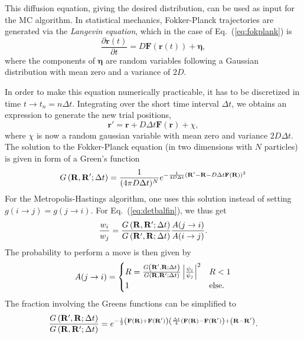 This diffusion equation, giving the desired distribution, can be used as input for the MC algorithm. In statistical mechanics, Fokker-Planck trajectories are generated via the \textit{Langevin equation}, which in the case of Eq.~(\ref{eq:fokplank}) is
\begin{equation}
\frac{\partial \mathbf{r}(t)}{\partial t} = D \mathbf{F}\left(\mathbf{r}(t)\right) + \mathbf{\eta},
\label{eq:langevin}
\end{equation}
where the components of $\mathbf{\eta}$ are random variables following a Gaussian distribution with mean zero and a variance of $2D$.

In order to make this equation numerically practicable, it has to be discretized in time $t \rightarrow t_n = n \Delta t$.
Integrating over the short time interval $\Delta t$, we obtains an expression to generate the new trial positions,
\begin{equation}
\mathbf{r}' = \mathbf{r} + D \Delta t\mathbf{F}\left(\mathbf{r}\right) + \chi,
\label{eq:trialpos}
\end{equation}
where $\chi$ is now a random gaussian variable with mean zero and variance $2D\Delta t$.\\
The solution to the Fokker-Planck equation (in two dimensions with $N$ particles) is given in form of a Green's function \cite{hammond1994monte}
\[
G\left(\mathbf{R},\mathbf{R}';\Delta t\right) = \frac{1}{(4\pi D \Delta t)^N} e^{-\frac{1}{4 D \Delta t} (\mathbf{R} '-\mathbf{R} - D\Delta t \mathbf{F}(\mathbf{R}))^ 2}
\]
For the Metropolis-Hastings algorithm, one uses this solution instead of setting $g(i\rightarrow j) = g(j\rightarrow i)$.
For Eq.~(\ref{eq:detbalfin}), we thus get
\begin{equation*}
\frac{w_i}{w_j} = \frac{G\left(\mathbf{R},\mathbf{R}';\Delta t\right)}{G\left(\mathbf{R}',\mathbf{R};\Delta t\right)}\frac{ A(j \rightarrow i)}{ A(i \rightarrow j)}. 
\end{equation*}
The probability to perform a move is then given by
\begin{equation}
A(j\rightarrow i) = \begin{cases}
R =  \frac{G\left(\rf',\rf;\Delta t\right)}{G\left(\rf,\rf';\Delta t\right)} \left|\frac{\psi_i}{\psi_j}\right|^2
& R < 1 \\
1 &  \text{else}.
\end{cases}
\label{eq:acceptr}
\end{equation}
The fraction involving the Greens functions can be simplified to
\begin{equation}
\frac{G\left(\rf',\rf;\Delta t\right)}{G\left(\rf,\rf';\Delta t\right)} = e^{-\frac{1}{2}\left(\mathbf{F}(\rf)+\mathbf{F}(\rf')\right)\left(\frac{\Delta t}{4}(\mathbf{F}(\rf)-\mathbf{F}(\rf')\right) + \left(\rf - \rf'\right)}.
\label{eq:greens_function}
\end{equation}


